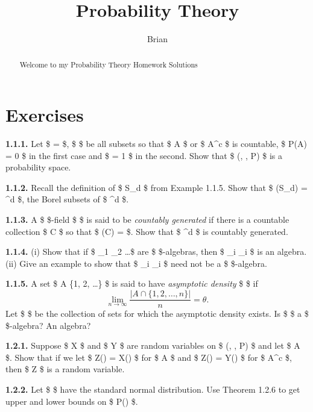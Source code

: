 \documentclass[
  letterpaper,
  DIV=11,
  numbers=noendperiod]{scrartcl}
\title{Probability Theory}
\author{Brian}
\date{}
\begin{document}
\maketitle
\begin{abstract}
Welcome to my Probability Theory Homework Solutions
\end{abstract}


\section{Exercises}\label{exercises}

\textbf{1.1.1.} Let \$ \Omega =  \$, \$  \$ be all
subsets so that \$ A \$ or \$ A\^{}c \$ is countable, \$ P(A) = 0 \$ in
the first case and \$ = 1 \$ in the second. Show that \$ (\Omega,
, P) \$ is a probability space.

\textbf{1.1.2.} Recall the definition of \$ S\_d \$ from Example 1.1.5.
Show that \$ \sigma(S\_d) = \^{}d \$, the Borel subsets of \$
\^{}d \$.

\textbf{1.1.3.} A \$ \sigma \$-field \$  \$ is said to be
\emph{countably generated} if there is a countable collection \$ C
\subset {} \$ so that \$ \sigma(C) =  \$. Show that
\$ \^{}d \$ is countably generated.

\textbf{1.1.4.} (i) Show that if \$ \_1
\subset {}\_2 \subset \dots \$ are \$ \sigma \$-algebras, then
\$ \cup\_i \_i \$ is an algebra. (ii) Give an example to show
that \$ \cup\_i \_i \$ need not be a \$ \sigma \$-algebra.

\textbf{1.1.5.} A set \$ A \subset \{1, 2, \dots\} \$ is said to have
\emph{asymptotic density} \$ \theta \$ if \[
\lim_{n \to \infty} \frac{|A \cap \{1, 2, \dots, n\}|}{n} = \theta.
\] Let \$  \$ be the collection of sets for which the
asymptotic density exists. Is \$  \$ a \$ \sigma \$-algebra?
An algebra?

\textbf{1.2.1.} Suppose \$ X \$ and \$ Y \$ are random variables on \$
(\Omega, , P) \$ and let \$ A \in {} \$. Show that
if we let \$ Z(\omega) = X(\omega) \$ for \$ \omega \in A \$ and \$
Z(\omega) = Y(\omega) \$ for \$ \omega \in A\^{}c \$, then \$ Z \$ is a
random variable.

\textbf{1.2.2.} Let \$ \chi \$ have the standard normal distribution.
Use Theorem 1.2.6 to get upper and lower bounds on \$ P(\chi {}) \$.
\end{document}

